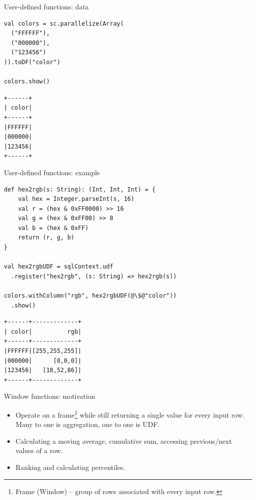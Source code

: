 \documentclass[unicode, notheorems]{beamer}
\begin{document}
\begin{frame}[fragile]{User-defined functions: data}

{\footnotesize
\begin{verbatim}
val colors = sc.parallelize(Array(
  ("FFFFFF"),
  ("000000"),
  ("123456")
)).toDF("color")

colors.show()
\end{verbatim}

\begin{verbatim}
+------+
| color|
+------+
|FFFFFF|
|000000|
|123456|
+------+
\end{verbatim}
}
\end{frame}

\begin{frame}[fragile]{User-defined functions: example}

{\footnotesize
\begin{verbatim}
def hex2rgb(s: String): (Int, Int, Int) = {
    val hex = Integer.parseInt(s, 16)
    val r = (hex & 0xFF0000) >> 16
    val g = (hex & 0xFF00) >> 8
    val b = (hex & 0xFF)
    return (r, g, b)
}

val hex2rgbUDF = sqlContext.udf
  .register("hex2rgb", (s: String) => hex2rgb(s))

colors.withColumn("rgb", hex2rgbUDF(@\$@"color"))
  .show()
\end{verbatim}
}

{\footnotesize
\begin{verbatim}
+------+-------------+
| color|          rgb|
+------+-------------+
|FFFFFF|[255,255,255]|
|000000|      [0,0,0]|
|123456|   [18,52,86]|
+------+-------------+
\end{verbatim}
}
\end{frame}

\begin{frame}{Window functions: motivation}
\begin{itemize}
	\item Operate on a frame\footnote{Frame (Window) -- group of rows associated with every input row.} while still returning a single value for every input row. Many to one is aggregation, one to one is UDF.
	\item Calculating a moving average, cumulative sum, accessing previous/next values of a row.
	\item Ranking and calculating percentiles.
\end{itemize}
\end{frame}
\end{document}
